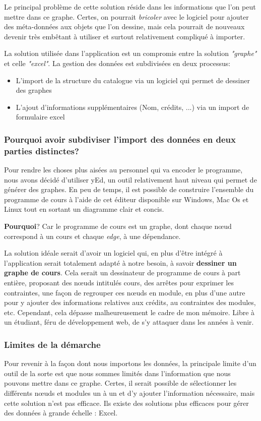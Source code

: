 Le principal problème de cette solution réside dans les informations que l'on peut mettre dans ce graphe. Certes, on pourrait \textit{bricoler} avec le logiciel pour ajouter des méta-données aux objets que l'on dessine, mais cela pourrait de nouveaux devenir très embêtant à utiliser et surtout relativement compliqué à importer. 
  
La solution utilisée dans l'application est un compromis entre la solution \textit{"graphe"} et celle \textit{"excel"}. La gestion des données est subdivisées en deux processus:
\begin{itemize}
\item L'import de la structure du catalogue via un logiciel qui permet de dessiner des graphes
\item L'ajout d'informations supplémentaires (Nom, crédits, ...) via un import de formulaire excel
\end{itemize}
\subsubsection{Pourquoi avoir subdiviser l'import des données en deux parties distinctes?}

Pour rendre les choses plus aisées au personnel qui va encoder le programme, nous avons décidé d'utiliser yEd, un outil relativement haut niveau qui permet de générer des graphes. En peu de temps, il est possible de construire l'ensemble du programme de cours à l'aide de cet éditeur disponible sur Windows, Mac Os et Linux tout en sortant un diagramme clair et concis.


\textbf{Pourquoi}? Car le programme de cours est un graphe, dont chaque nœud correspond à un cours et chaque \textit{edge}, à une dépendance. 

La solution idéale serait d'avoir un logiciel qui, en plus d'être intégré à l'application serait totalement adapté à notre besoin, à savoir \textbf{dessiner un graphe de cours}. Cela serait un dessinateur de programme de cours à part entière, proposant des nœuds intitulés cours, des arrêtes pour exprimer les contraintes, une façon de regrouper ces nœuds en module, en plus d'une autre pour y ajouter des informations relatives aux crédits, au contraintes des modules, etc. Cependant, cela dépasse malheureusement le cadre de mon mémoire. Libre à un étudiant, féru de développement web, de s'y attaquer dans les années à venir.

\subsubsection{Limites de la démarche}
Pour revenir à la façon dont nous importons les données, la principale limite d'un outil de la sorte est que nous sommes limités dans l'information que nous pouvons mettre dans ce graphe. Certes, il serait possible de sélectionner les différents nœuds et modules un à un et d'y ajouter l'information nécessaire, mais cette solution n'est pas efficace. Ils existe des solutions plus efficaces pour gérer des données à grande échelle : Excel.

